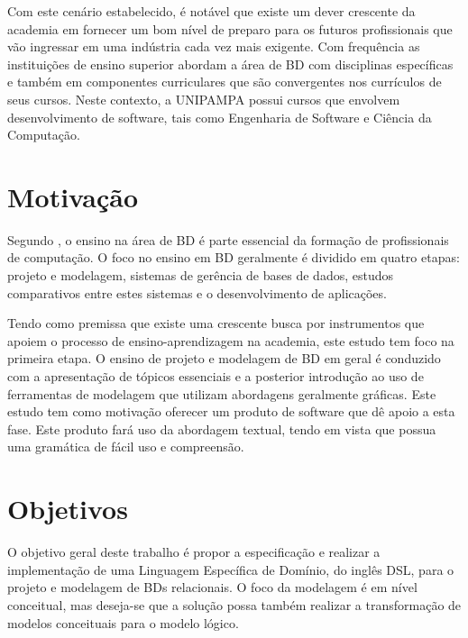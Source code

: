 Com este cenário estabelecido, é notável que existe um dever crescente da academia em fornecer um bom nível de preparo para os futuros profissionais que vão ingressar em uma indústria cada vez mais exigente. 
Com frequência as instituições de ensino superior abordam a área de \ac{BD} com disciplinas específicas e também em componentes curriculares que são convergentes nos currículos de seus cursos. 
Neste contexto, a UNIPAMPA possui cursos que envolvem desenvolvimento de software, tais como Engenharia de Software e Ciência da Computação.

\section{Motivação}

Segundo , o ensino na área de \ac{BD} é parte essencial da formação de profissionais de computação. 
O foco no ensino em \ac{BD} geralmente é dividido em quatro etapas: projeto e modelagem, sistemas de gerência de bases de dados, estudos comparativos entre estes sistemas e o desenvolvimento de aplicações. 

Tendo como premissa que existe uma crescente busca por instrumentos que apoiem o processo de ensino-aprendizagem na academia, este estudo tem foco na primeira etapa. 
O ensino de projeto e modelagem de \ac{BD} em geral é conduzido com a apresentação de tópicos essenciais e a posterior introdução ao uso de ferramentas de modelagem que utilizam abordagens geralmente gráficas. 
Este estudo tem como motivação oferecer um produto de software que dê apoio a esta fase. 
Este produto fará uso da abordagem textual, tendo em vista que possua uma gramática de fácil uso e compreensão.

\section{Objetivos}

O objetivo geral deste trabalho é propor a especificação e realizar a implementação de uma Linguagem Específica de Domínio, do inglês \ac{DSL}, para o projeto e modelagem de \acp{BD} relacionais. 
O foco da modelagem é em nível conceitual, mas deseja-se que a solução possa também realizar a transformação de modelos conceituais para o modelo lógico. 

